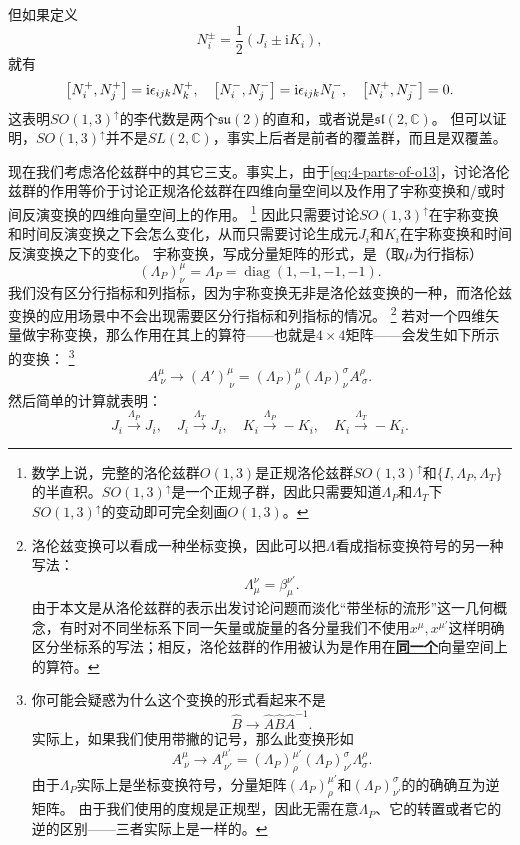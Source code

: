 \documentclass[hyperref, UTF8, a4paper]{ctexart}
\DeclareMathOperator{\diag}{diag}
\newcommand*{\ii}{\mathrm{i}}
\newcommand*{\complexes}{\mathbb{C}}
\newcommand{\concept}[1]{\underline{\textbf{#1}}}
\begin{document}
但如果定义
\begin{equation}
    N_i^\pm = \frac{1}{2} (J_i \pm \ii K_i),
    \label{eq:def-n-pm}
\end{equation}
就有
\begin{equation}
    \comm{N_i^+}{N_j^+} = \ii \epsilon_{ijk} N_k^+, \quad \comm{N_i^-}{N_j^-} = \ii \epsilon_{ijk} N_l^-, \quad \comm{N^+_i}{N^-_j} = 0.
    \label{eq:two-su2-algebra}
\end{equation}
这表明$SO(1,3)^\uparrow$的李代数是两个$\mathfrak{su}(2)$的直和，或者说是$\mathfrak{sl}(2, \complexes)$。
但可以证明，$SO(1,3)^\uparrow$并不是$SL(2, \complexes)$，事实上后者是前者的覆盖群，而且是双覆盖。

现在我们考虑洛伦兹群中的其它三支。事实上，由于\eqref{eq:4-parts-of-o13}，讨论洛伦兹群的作用等价于讨论正规洛伦兹群在四维向量空间以及作用了宇称变换和/或时间反演变换的四维向量空间上的作用。%
\footnote{数学上说，完整的洛伦兹群$O(1,3)$是正规洛伦兹群$SO(1,3)^\uparrow$和$\{I, \Lambda_P, \Lambda_T\}$的半直积。$SO(1,3)^\uparrow$是一个正规子群，因此只需要知道$\Lambda_P$和$\Lambda_T$下$SO(1,3)^\uparrow$的变动即可完全刻画$O(1,3)$。}%
因此只需要讨论$SO(1,3)^\uparrow$在宇称变换和时间反演变换之下会怎么变化，从而只需要讨论生成元$J_i$和$K_i$在宇称变换和时间反演变换之下的变化。
宇称变换，写成分量矩阵的形式，是（取$\mu$为行指标）
\[
    (\Lambda_P)^\mu_\nu = \Lambda_P = \diag(1, -1, -1, -1).
\]
我们没有区分行指标和列指标，因为宇称变换无非是洛伦兹变换的一种，而洛伦兹变换的应用场景中不会出现需要区分行指标和列指标的情况。%
\footnote{洛伦兹变换可以看成一种坐标变换，因此可以把$\Lambda$看成指标变换符号的另一种写法：
\[
    \Lambda_\mu^\nu = \beta_{\mu}^{\nu'}.
\]
由于本文是从洛伦兹群的表示出发讨论问题而淡化“带坐标的流形”这一几何概念，有时对不同坐标系下同一矢量或旋量的各分量我们不使用$x^\mu, x^{\mu'}$这样明确区分坐标系的写法；相反，洛伦兹群的作用被认为是作用在\concept{同一个}向量空间上的算符。
}%
若对一个四维矢量做宇称变换，那么作用在其上的算符——也就是$4\times 4$矩阵——会发生如下所示的变换：%
\footnote{你可能会疑惑为什么这个变换的形式看起来不是
\[
    \hat{B} \longrightarrow \hat{A} \hat{B} \hat{A}^{-1}.
\]
实际上，如果我们使用带撇的记号，那么此变换形如
\[
    A^\mu_{\ \nu} \longrightarrow A^{\mu'}_{\ \nu'} = (\Lambda_P)^{\mu'}_\rho (\Lambda_P)^\sigma_{\nu'} \Lambda^\rho_\sigma.
\]
由于$\Lambda_P$实际上是坐标变换符号，分量矩阵$(\Lambda_P)^{\mu'}_\rho$和$(\Lambda_P)^\sigma_{\nu'}$的的确确互为逆矩阵。
由于我们使用的度规是正规型，因此无需在意$\Lambda_P$、它的转置或者它的逆的区别——三者实际上是一样的。
}%
\[
    A^\mu_{\ \nu} \longrightarrow (A')^\mu_{\ \nu} = (\Lambda_P)^\mu_\rho (\Lambda_P)^\sigma_\nu A^\rho_{\ \sigma}.
\]
然后简单的计算就表明：
\begin{equation}
    J_i \stackrel{\Lambda_P}{\longrightarrow} J_i, \quad J_i \stackrel{\Lambda_T}{\longrightarrow} J_i, \quad K_i \stackrel{\Lambda_P}{\longrightarrow} - K_i, \quad K_i \stackrel{\Lambda_T}{\longrightarrow} - K_i.
    \label{eq:parity-and-time-reversion-transform}
\end{equation}
\end{document}
